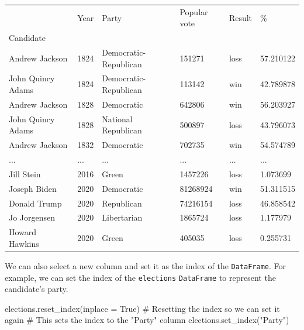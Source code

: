 \documentclass[
  letterpaper,
  DIV=11,
  numbers=noendperiod]{scrreprt}
\newenvironment{Shaded}{\begin{snugshade}}{\end{snugshade}}
\newcommand{\CommentTok}[1]{\textcolor[rgb]{0.37,0.37,0.37}{#1}}
\newcommand{\NormalTok}[1]{\textcolor[rgb]{0.00,0.23,0.31}{#1}}
\newcommand{\OperatorTok}[1]{\textcolor[rgb]{0.37,0.37,0.37}{#1}}
\newcommand{\StringTok}[1]{\textcolor[rgb]{0.13,0.47,0.30}{#1}}
\newcommand{\VariableTok}[1]{\textcolor[rgb]{0.07,0.07,0.07}{#1}}
\begin{document}
\begin{longtable}[]{@{}llllll@{}}
\toprule\noalign{}
& Year & Party & Popular vote & Result & \% \\
Candidate & & & & & \\
\midrule\noalign{}
\endhead
\bottomrule\noalign{}
\endlastfoot
Andrew Jackson & 1824 & Democratic-Republican & 151271 & loss &
57.210122 \\
John Quincy Adams & 1824 & Democratic-Republican & 113142 & win &
42.789878 \\
Andrew Jackson & 1828 & Democratic & 642806 & win & 56.203927 \\
John Quincy Adams & 1828 & National Republican & 500897 & loss &
43.796073 \\
Andrew Jackson & 1832 & Democratic & 702735 & win & 54.574789 \\
... & ... & ... & ... & ... & ... \\
Jill Stein & 2016 & Green & 1457226 & loss & 1.073699 \\
Joseph Biden & 2020 & Democratic & 81268924 & win & 51.311515 \\
Donald Trump & 2020 & Republican & 74216154 & loss & 46.858542 \\
Jo Jorgensen & 2020 & Libertarian & 1865724 & loss & 1.177979 \\
Howard Hawkins & 2020 & Green & 405035 & loss & 0.255731 \\
\end{longtable}

We can also select a new column and set it as the index of the
\texttt{DataFrame}. For example, we can set the index of the
\texttt{elections} \texttt{DataFrame} to represent the candidate's
party.

\begin{Shaded}
\begin{Highlighting}[]
\NormalTok{elections.reset\_index(inplace }\OperatorTok{=} \VariableTok{True}\NormalTok{) }\CommentTok{\# Resetting the index so we can set it again}
\CommentTok{\# This sets the index to the "Party" column}
\NormalTok{elections.set\_index(}\StringTok{"Party"}\NormalTok{)}
\end{Highlighting}
\end{Shaded}
\end{document}
